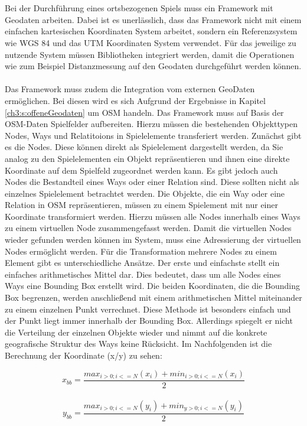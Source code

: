 \\\\
Bei der Durchführung eines ortsbezogenen Spiels muss ein Framework mit Geodaten arbeiten.
Dabei ist es unerlässlich, dass das Framework nicht mit einem einfachen kartesischen Koordinaten System arbeitet, sondern ein Referenzsystem wie WGS 84 \cite{Grafarend.1998} und das UTM Koordinaten System \cite{Grafarend.1995} verwendet.
Für das jeweilige zu nutzende System müssen Bibliotheken integriert werden, damit die Operationen wie zum Beispiel Distanzmessung auf den Geodaten durchgeführt werden können.
\\\\
Das Framework muss zudem die Integration vom externen GeoDaten ermöglichen. Bei diesen wird es sich Aufgrund der Ergebnisse in Kapitel \ref{ch3:s:offeneGeodaten} um OSM handeln.
Das Framework muss auf Basis der OSM-Daten Spielfelder aufbereiten. Hierzu müssen die bestehenden Objekttypen Nodes, Ways und Relatitoions in Spielelemente transferiert werden.
Zunächst gibt es die Nodes. Diese können direkt als Spielelement dargestellt werden, da Sie analog zu den Spielelementen ein Objekt repräsentieren und ihnen eine direkte Koordinate auf dem Spielfeld zugeordnet werden kann. Es gibt jedoch auch Nodes die Bestandteil eines Ways oder einer Relation sind. Diese sollten nicht als einzelnes Spielelement betrachtet werden.
Die Objekte, die ein Way oder eine Relation in OSM repräsentieren, müssen zu einem Spielement mit nur einer Koordinate transformiert werden. Hierzu müssen alle Nodes innerhalb eines Ways zu einem \glqq virtuellen\grqq{} Node zusammengefasst werden.
Damit die virtuellen Nodes wieder gefunden werden können im System, muss eine Adressierung der virtuellen Nodes ermöglicht werden.
Für die Transformation mehrere Nodes zu einem Element gibt es unterschiedliche Ansätze. Der erste und einfachste stellt ein einfaches arithmetisches Mittel dar. Dies bedeutet, dass um alle Nodes eines Ways eine Bounding Box erstellt wird. Die beiden Koordinaten, die die Bounding Box begrenzen, werden anschließend mit einem arithmetischen Mittel miteinander zu einem einzelnen Punkt verrechnet. Diese Methode ist besonders einfach und der Punkt liegt immer innerhalb der Bounding Box. Allerdings spiegelt er nicht die Verteilung der einzelnen Objekte wieder und nimmt auf die konkrete geografische Struktur des Ways keine Rücksicht. Im Nachfolgenden ist die Berechnung der Koordinate (x/y) zu sehen:

\begin{equation}
x_{bb} = \frac{max_{i>0; i<=N}(x_i) + min_{i>0; i<=N}(x_i)}{2}
\end{equation}
\\
\begin{equation}
y_{bb} = \frac{max_{i>0; i<=N}(y_i) + min_{y>0; i<=N}(y_i)}{2}
\end{equation}

